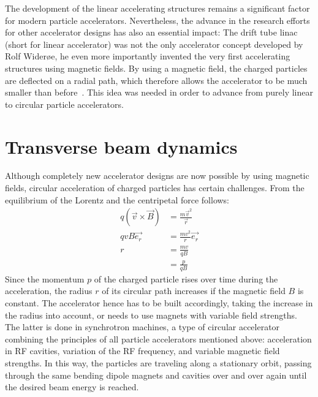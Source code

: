 The development of the linear accelerating structures remains a significant factor for modern particle accelerators.
Nevertheless, the advance in the research efforts for other accelerator designs has also an essential impact:
The drift tube linac (short for linear accelerator) was not the only accelerator concept developed by Rolf Wider\o e, he even more importantly invented the very first accelerating structures using magnetic fields.
By using a magnetic field, the charged particles are deflected on a radial path, which therefore allows the accelerator to be much smaller than before~\cite[cf. p. 8]{Wilson}.
This idea was needed in order to advance from purely linear to circular particle accelerators.


\section{Transverse beam dynamics}
\label{AccPhysics:Magnets}

Although completely new accelerator designs are now possible by using magnetic fields, circular acceleration of charged particles has certain challenges.
From the equilibrium of the Lorentz and the centripetal force follows:
\begin{align}
q(\vec{v}\times \vec{B}) &= \frac{m\vec{v}^2}{\vec{r}}\\
qvB\vec{e_r} &= \frac{mv^2}{r}\vec{e_r} \nonumber \\
 r&=\frac{mv}{qB}\\
 &=\frac{p}{qB}\label{eq:MagField_Radius}
\end{align}
Since the momentum $p$ of the charged particle rises over time during the acceleration, the radius $r$ of its circular path increases if the magnetic field $B$ is constant.
The accelerator hence has to be built accordingly, taking the increase in the radius into account, or needs to use magnets with variable field strengths.
The latter is done in synchrotron machines, a type of circular accelerator combining the principles of all particle accelerators mentioned above: acceleration in RF cavities, variation of the RF frequency, and variable magnetic field strengths.
In this way, the particles are traveling along a stationary orbit, passing through the same bending dipole magnets and cavities over and over again until the desired beam energy is reached.


